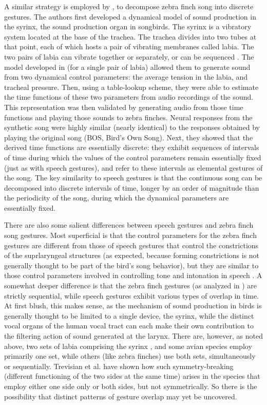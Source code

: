 \documentclass[output=paper,
modfonts
]{LSP/langsci}
\begin{document}
A similar strategy is employed by \citet{Amador2013}, to decompose zebra finch song into discrete gestures. The authors first developed a dynamical model of sound production in the syrinx, the sound production organ in songbirds. The syrinx is a vibratory system located at the base of the trachea. The trachea divides into two tubes at that point, each of which hosts a pair of vibrating membranes called labia. The two pairs of labia can vibrate together or separately, or can be sequenced \citep{RiedeGoller}.  The model developed in \citet{Amador2013} (for a single pair of labia) allowed them to generate sound from two dynamical control parameters: the average tension in the labia, and tracheal pressure. Then, using a table-lookup scheme, they were able to estimate the time functions of these two parameters from audio recordings of the sound. This representation was then validated by generating audio from those time functions and playing those sounds to zebra finches. Neural responses from the synthetic song were highly similar (nearly identical) to the responses obtained by playing the original song (BOS, Bird's Own Song). Next, they showed that the derived time functions are essentially discrete: they exhibit sequences of intervals of time during which the values of the control parameters remain essentially fixed (just as with speech gestures), and refer to these intervals as elemental gestures of the song. The key similarity to speech gestures is that the continuous song can be decomposed into discrete intervals of time, longer by an order of magnitude than the periodicity of the song, during which the dynamical parameters are essentially fixed. 

There are also some salient differences between speech gestures and zebra finch song gestures. Most superficial is that the control parameters for the zebra finch gestures are different from those of speech gestures that control the constrictions of the suprlaryngeal structures (as expected, because forming constrictions is not generally thought to be part of the bird's song behavior), but they are similar to those control parameters involved in controlling tone and intonation in speech \citep{McGowanSaltz}. 
A somewhat deeper difference is that the zebra finch gestures (as analyzed in \citealt{Amador2013}) are strictly sequential, while speech gestures exhibit various types of overlap in time. At first blush, this makes sense, as the mechanism of sound production in birds is generally thought to be limited to a single device, the syrinx, while the distinct vocal organs of the human vocal tract can each make their own contribution to the filtering action of sound generated at the larynx. There are, however, as noted above, two sets of labia comprising the syrinx \citep{Trevas2007}, and some avian species employ primarily one set, while others (like zebra finches) use both sets, simultaneously or sequentially.   Trevisian et al. \citeyearpar{Trevas2007} have shown how such symmetry-breaking (different functioning of the two sides at the same time) arises in the species that employ either one side only or both sides, but not symmetrically. So there is the possibility that distinct patterns of gesture overlap may yet be uncovered.
\end{document}
